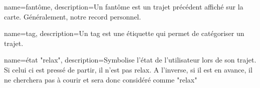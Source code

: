 % 

{
    name=fantôme,
    description={Un fantôme est un trajet précédent affiché sur la carte. Généralement, notre record personnel.}
}

{
    name=tag,
    description={Un tag est une étiquette qui permet de catégoriser un trajet.}
}

{
    name={état "relax"},
    description={Symbolise l'état de l'utilisateur lors de son trajet. Si celui ci est pressé de partir, il n'est pas relax. A l'inverse, si il est en avance, il ne cherchera pas à courir et sera donc considéré comme "relax"}
}


